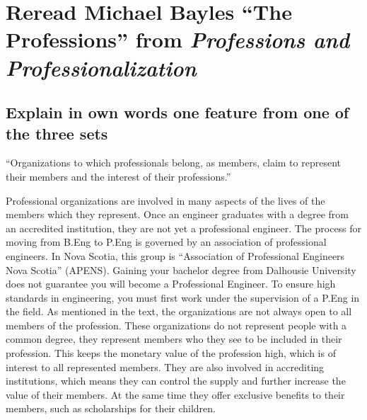 \section{Reread Michael Bayles ``The Professions'' from \textit{Professions and Professionalization}}
\subsection{Explain in own words one feature from one of the three sets}


\begin{center}
``Organizations to which professionals belong, as members, claim to represent their members and the interest of their professions.''
\end{center}
Professional organizations are involved in many aspects of the lives of the members which they represent. Once an engineer graduates with a degree from an accredited institution, they are not yet a professional engineer. The process for moving from B.Eng to P.Eng is governed by an association of professional engineers. In Nova Scotia, this group is ``Association of Professional Engineers Nova Scotia'' (APENS). Gaining your bachelor degree from Dalhousie University does not guarantee you will become a Professional Engineer. To ensure high standards in engineering, you must first work under the supervision of a P.Eng in the field. As mentioned in the text, the organizations are not always open to all members of the profession. These organizations do not represent people with a common degree, they represent members who they see to be included in their profession. This keeps the monetary value of the profession high, which is of interest to all represented members. They are also involved in accrediting institutions, which means they can control the supply and further increase the value of their members. At the same time they offer exclusive benefits to their members, such as scholarships for their children.

